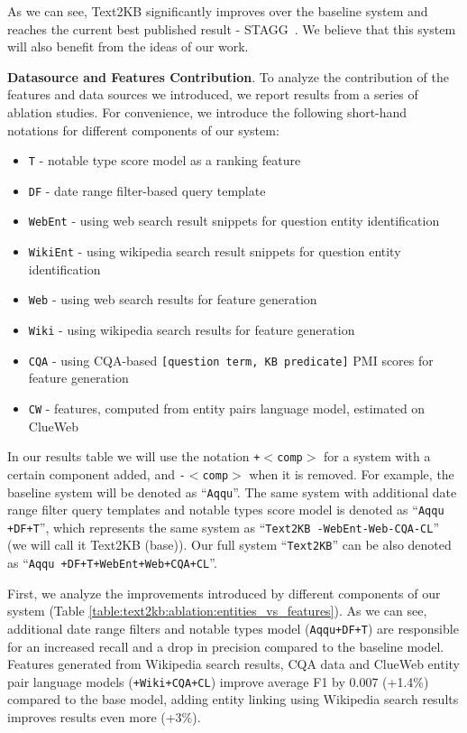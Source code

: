 As we can see, Text2KB significantly improves over the baseline system and reaches the current best published result - STAGG~\cite{yih:ACL:2015:STAGG}. 
We believe that this system will also benefit from the ideas of our work.

\textbf{Datasource and Features Contribution}.
To analyze the contribution of the features and data sources we introduced, we report results from a series of ablation studies. For convenience, we introduce the following short-hand notations for different components of our system:

\begin{itemize}
\item \texttt{T} - notable type score model as a ranking feature
\item \texttt{DF} - date range filter-based query template
\item \texttt{WebEnt} - using web search result snippets for question entity identification
\item \texttt{WikiEnt} - using wikipedia search result snippets for question entity identification
\item \texttt{Web} - using web search results for feature generation
\item \texttt{Wiki} - using wikipedia search results for feature generation
\item \texttt{CQA} - using CQA-based \texttt{[question term, KB predicate]} PMI scores for feature generation
\item \texttt{CW} - features, computed from entity pairs language model, estimated on ClueWeb
\end{itemize}

In our results table we will use the notation \texttt{+$<$comp$>$} for a system with a certain component added, and \texttt{-$<$comp$>$} when it is removed.
For example, the baseline system will be denoted as ``\texttt{Aqqu}''.
The same system with additional date range filter query templates and notable types score model is denoted as ``\texttt{Aqqu +DF+T}'', which represents the same system as ``\texttt{Text2KB -WebEnt-Web-CQA-CL}'' (we will call it Text2KB (base)).
Our full system ``\texttt{Text2KB}'' can be also denoted as ``\texttt{Aqqu +DF+T+WebEnt+Web+CQA+CL}''.

First, we analyze the improvements introduced by different components of our system (Table \ref{table:text2kb:ablation:entities_vs_features}).
As we can see, additional date range filters and notable types model (\texttt{Aqqu+DF+T}) are responsible for an increased recall and a drop in precision compared to the baseline model.
Features generated from Wikipedia search results, CQA data and ClueWeb entity pair language models (\texttt{+Wiki+CQA+CL}) improve average F1 by 0.007 (+1.4\%) compared to the base model, adding entity linking using Wikipedia search results improves results even more (+3\%).

